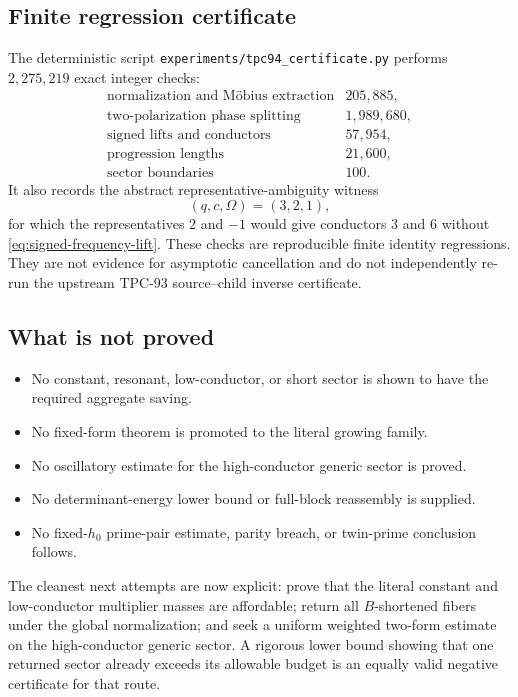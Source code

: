 \subsection{Finite regression certificate}

The deterministic script
\texttt{experiments/tpc94\_certificate.py} performs
\(2{,}275{,}219\) exact integer checks:
\[
\begin{array}{lr}
\text{normalization and M\"obius extraction}&205{,}885,\\
\text{two-polarization phase splitting}&1{,}989{,}680,\\
\text{signed lifts and conductors}&57{,}954,\\
\text{progression lengths}&21{,}600,\\
\text{sector boundaries}&100.
\end{array}
\]
It also records the abstract representative-ambiguity witness
\[
 (q,c,\Omega)=(3,2,1),
\]
for which the representatives \(2\) and \(-1\) would give conductors
\(3\) and \(6\) without
\eqref{eq:signed-frequency-lift}.  These checks are reproducible
finite identity regressions.  They are not evidence for asymptotic
cancellation and do not independently re-run the upstream TPC-93
source--child inverse certificate.

\subsection{What is not proved}

\begin{itemize}[leftmargin=2em]
\item No constant, resonant, low-conductor, or short sector is shown
  to have the required aggregate saving.
\item No fixed-form theorem is promoted to the literal growing
  family.
\item No oscillatory estimate for the high-conductor generic sector
  is proved.
\item No determinant-energy lower bound or full-block reassembly is
  supplied.
\item No fixed-\(h_0\) prime-pair estimate, parity breach, or
  twin-prime conclusion follows.
\end{itemize}

\begin{remark}
The cleanest next attempts are now explicit: prove that the literal
constant and low-conductor multiplier masses are affordable; return
all \(B\)-shortened fibers under the global normalization; and seek
a uniform weighted two-form estimate on the high-conductor generic
sector.  A rigorous lower bound showing that one returned sector
already exceeds its allowable budget is an equally valid negative
certificate for that route.
\end{remark}
